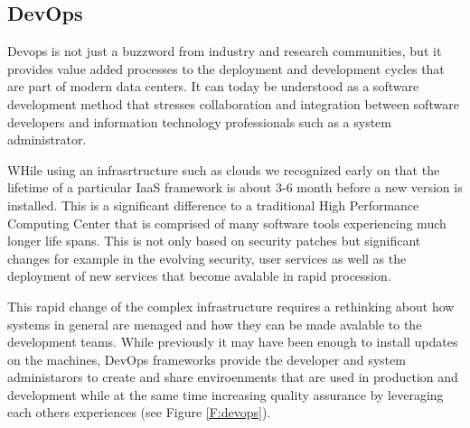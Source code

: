 \subsection{DevOps}

Devops is not just a buzzword from industry and research communities,
but it provides value added processes to the deployment and
development cycles that are part of modern data centers. It can today
be understood as a software development method that stresses
collaboration and integration between software developers and
information technology professionals such as a system administrator. 

WHile using an infrasrtructure such as clouds we recognized early on
that the lifetime of a particular IaaS framework is about 3-6 month
before a new version is installed. This is a significant difference to
a traditional High Performance Computing Center that is comprised of
many software tools experiencing much longer life spans. This is not
only based on security patches but significant changes for example in
the evolving security, user services as well as the deployment of new
services that become avalable in rapid procession.

This rapid change of the complex infrastructure requires a rethinking
about how systems in general are menaged and how they can be made
avalable to the development teams. While previously it may have been
enough to install updates on the machines, DevOps frameworks provide
the developer and system administarors to create and share
enviroenments that are used in production and development while at the
same time increasing quality assurance by leveraging each others
experiences (see Figure \ref{F:devops}).


